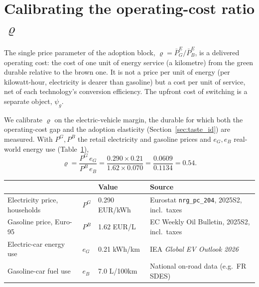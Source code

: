 \section{Calibrating the operating-cost ratio \texorpdfstring{$\varrho$}{rho}}
\label{app:rho}

The single price parameter of the adoption block, $\varrho=\bar P^E_G/\bar P^E_B$,
is a delivered operating cost: the cost of one unit of energy service (a kilometre)
from the green durable relative to the brown one. It is not a price per unit of
energy (per kilowatt-hour, electricity is dearer than gasoline) but a cost per unit
of service, net of each technology's conversion efficiency. The upfront cost of
switching is a separate object, $\psi_g$.

We calibrate $\varrho$ on the electric-vehicle margin, the durable for which both
the operating-cost gap and the adoption elasticity (Section~\ref{sec:taste_id}) are
measured. With $P^G,P^B$ the retail electricity and gasoline prices and $e_G,e_B$
real-world energy use (Table~\ref{tab:rho_inputs}),
\[
  \varrho=\frac{P^G\,e_G}{P^B\,e_B}
        =\frac{0.290\times0.21}{1.62\times0.070}
        =\frac{0.0609}{0.1134}=0.54 .
\]

\begin{table}[H]\centering
{}
\small
\begin{tabular}{llll}
\toprule
 & & Value & Source \\
\midrule
Electricity price, households & $P^G$ & 0.290 EUR/kWh & Eurostat \texttt{nrg\_pc\_204}, 2025S2, incl.\ taxes \\
Gasoline price, Euro-95       & $P^B$ & 1.62 EUR/L    & EC Weekly Oil Bulletin, 2025S2, incl.\ taxes \\
Electric-car energy use       & $e_G$ & 0.21 kWh/km   & IEA \textit{Global EV Outlook 2026} \\
Gasoline-car fuel use         & $e_B$ & 7.0 L/100km   & National on-road data (e.g.\ FR SDES) \\
\bottomrule
\end{tabular}
\label{tab:rho_inputs}
\end{table}

